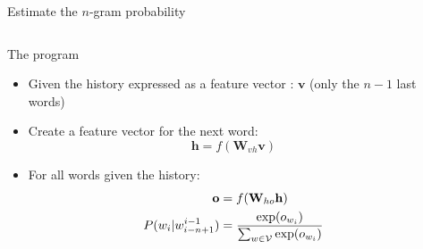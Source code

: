 \begin{frame}{Estimate the $n$-gram probability}
  \begin{columns}
    \begin{column}{0.6\textwidth}
      \begin{block}{The program}
        \begin{itemize}
        \item<1-> Given  the history expressed as a  feature vector :
          {$\mathbf{v}$} (only the $n-1$ last words)
        \item<2-> Create a feature vector for the next word: $$ \mathbf{h} = f(\mathbf{W}_{vh} \mathbf{v}) $$
        \item<3-> For all words given the history:
          \begin{align*}
            \mathbf{o} &= f(\mathbf{W}_{ho} \mathbf{h}) \\
            P({w}_i|{{w}_{i-n+1}^{i-1}}) &= \frac{\exp(o_{w_i})}{\sum_{{w}
                                          \in {\mathcal{V}}}\exp(o_{w_i}) }
          \end{align*}
        \end{itemize}
      \end{block}
    \end{column}
    \begin{column}{0.4\textwidth}
    \end{column}
  \end{columns}
\end{frame}


